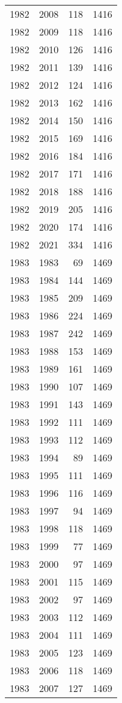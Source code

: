 \documentclass[
  10pt,
  letterpaper,
  DIV=11,
  numbers=noendperiod,
  twoside]{scrartcl}
\begin{document}
\begin{longtable}[]{@{}rrrr@{}}
1982 & 2008 & 118 & 1416 \\
1982 & 2009 & 118 & 1416 \\
1982 & 2010 & 126 & 1416 \\
1982 & 2011 & 139 & 1416 \\
1982 & 2012 & 124 & 1416 \\
1982 & 2013 & 162 & 1416 \\
1982 & 2014 & 150 & 1416 \\
1982 & 2015 & 169 & 1416 \\
1982 & 2016 & 184 & 1416 \\
1982 & 2017 & 171 & 1416 \\
1982 & 2018 & 188 & 1416 \\
1982 & 2019 & 205 & 1416 \\
1982 & 2020 & 174 & 1416 \\
1982 & 2021 & 334 & 1416 \\
1983 & 1983 & 69 & 1469 \\
1983 & 1984 & 144 & 1469 \\
1983 & 1985 & 209 & 1469 \\
1983 & 1986 & 224 & 1469 \\
1983 & 1987 & 242 & 1469 \\
1983 & 1988 & 153 & 1469 \\
1983 & 1989 & 161 & 1469 \\
1983 & 1990 & 107 & 1469 \\
1983 & 1991 & 143 & 1469 \\
1983 & 1992 & 111 & 1469 \\
1983 & 1993 & 112 & 1469 \\
1983 & 1994 & 89 & 1469 \\
1983 & 1995 & 111 & 1469 \\
1983 & 1996 & 116 & 1469 \\
1983 & 1997 & 94 & 1469 \\
1983 & 1998 & 118 & 1469 \\
1983 & 1999 & 77 & 1469 \\
1983 & 2000 & 97 & 1469 \\
1983 & 2001 & 115 & 1469 \\
1983 & 2002 & 97 & 1469 \\
1983 & 2003 & 112 & 1469 \\
1983 & 2004 & 111 & 1469 \\
1983 & 2005 & 123 & 1469 \\
1983 & 2006 & 118 & 1469 \\
1983 & 2007 & 127 & 1469 \\

\end{longtable}
\end{document}
